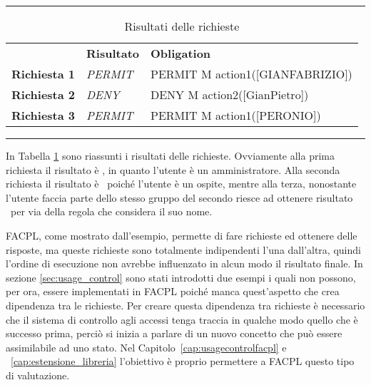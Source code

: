 \begin{table}[H]
\centering
\caption{Risultati delle richieste}
\label{tab:risultati_richieste}
\hrule
\begin{tabular}{lll}
 & \textbf{Risultato} & \textbf{Obligation} \\
\textbf{Richiesta 1} & \textit{PERMIT} & PERMIT M action1({[}GIANFABRIZIO{]}) \\
\textbf{Richiesta 2} & \textit{DENY} & DENY M action2({[}GianPietro{]}) \\
\textbf{Richiesta 3} & \textit{PERMIT} & PERMIT M action1({[}PERONIO{]})
\end{tabular}
\hrule
\end{table}
In Tabella \ref{tab:risultati_richieste} sono riassunti i risultati delle richieste. Ovviamente alla prima richiesta il risultato è \permit, in quanto l'utente è un amministratore. Alla seconda richiesta il risultato è \deny \ poiché l'utente è un ospite, mentre alla terza, nonostante l'utente faccia parte dello stesso gruppo del secondo riesce ad ottenere risultato \permit \ per via della regola che considera il suo nome.\\ \par
FACPL, come mostrato dall'esempio, permette di fare richieste ed ottenere delle risposte, ma queste richieste sono totalmente indipendenti l'una dall'altra, quindi l'ordine di esecuzione non avrebbe influenzato in alcun modo il risultato finale.
In sezione \ref{sec:usage_control} sono stati introdotti due esempi i quali non possono, per ora, essere implementati in FACPL poiché manca quest'aspetto che crea dipendenza tra le richieste.
Per creare questa dipendenza tra richieste è necessario che il sistema di controllo agli accessi tenga traccia in qualche modo quello che è successo prima, perciò si inizia a parlare di un nuovo concetto che può essere assimilabile ad uno stato. Nel Capitolo~\ref{cap:usagecontrolfacpl} e ~\ref{cap:estensione_libreria} l'obiettivo è proprio permettere a FACPL questo tipo di valutazione.

